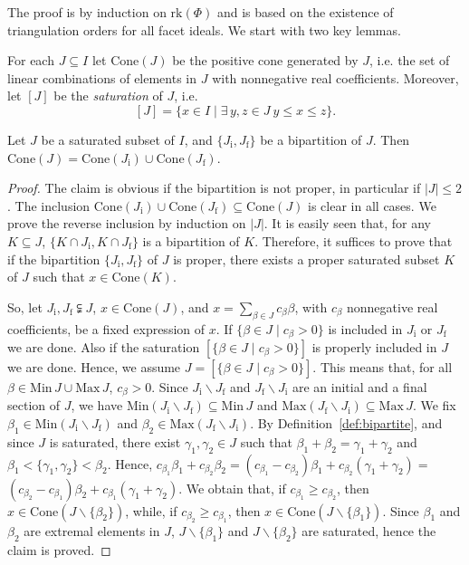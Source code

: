 \documentclass[ALCO,published]{cedram}
\theoremstyle{plain}
\newcommand\smeno{\smallsetminus}
\newcommand\cone{\mathrm{Cone}}
\newcommand\Min{\mathrm{Min}}
\newcommand\Max{\mathrm{Max}}
\newcommand\rk{\mathrm{rk}}
\newcommand\be{\beta}
\newcommand\ga{\gamma}
\renewcommand{\leq}{\leqslant}
\begin{document}
The proof is by induction on $\rk(\Phi)$ and is based on the existence of triangulation orders for all facet ideals. 
We start with two key lemmas. 

\par
For each $J\subseteq I$ let $\cone(J)$ be the positive cone generated by $J$, i.e. the set of linear combinations of elements in $J$ with nonnegative real coefficients.
Moreover, let $[J]$ be the {\it saturation} of $J$, i.e. 
$$[J]=\{x\in I\mid \exists\, y,z\in J\ y\leq x\leq z\}.$$ 


\begin{lem}\label{lem:coni-bipartite}
Let $J$ be a saturated subset of $I$, and  $\{J_{\mathrm i},J_{\mathrm f}\}$ be a  bipartition of $J$.
Then $\cone(J)=\cone(J_{\mathrm i})\cup \cone(J_{\mathrm f})$. 
\end{lem}

\begin{proof}
The claim is obvious if the bipartition is not proper, in particular if $|J|\leq 2$. 
The inclusion $\cone(J_{\mathrm i})\cup \cone(J_{\mathrm f})\subseteq \cone(J)$ is clear in all cases.
We prove the reverse inclusion by induction on $|J|$. 
It is easily seen that, for any $K\subseteq J$, $\{K\cap J_{\mathrm i}, K\cap J_{\mathrm f}\}$ is a bipartition of $K$.  
Therefore, it suffices to prove that if the bipartition $\{J_{\mathrm i},J_{\mathrm f}\}$ of $J$ is proper,  there exists a proper saturated subset $K$ of $J$ such that $x\in \cone(K)$. 
\par

So, let $J_{\mathrm i}, J_{\mathrm f}\subsetneqq J$, $x\in \cone(J)$, and $x=\sum\limits_{\be\in J}c_\be\be$,  with $c_\be$ nonnegative real coefficients, be a fixed expression of $x$.
If $\{\be\in J\mid c_\be> 0\}$ is included in $J_{\mathrm i}$ or $J_{\mathrm f}$ we are done.
Also if the saturation $[\{\be\in J\mid c_\be> 0\}]$ is properly included in $J$ we are done.
Hence, we assume  $J=[\{\be\in J\mid c_\be> 0\}]$. 
This means that, for all $\be\in \Min\, J\cup  \Max\, J$, $c_\be> 0$.
Since $J_{\mathrm i}\smeno J_{\mathrm f}$ and $J_{\mathrm f}\smeno J_{\mathrm i}$ are an initial and a final section of $J$, we have  $\Min(J_{\mathrm i}\smeno J_{\mathrm f})\subseteq \Min\, J$ and $\Max(J_{\mathrm f}\smeno J_{\mathrm i})\subseteq \Max\, J$.
We fix  $\be_1\in \Min (J_{\mathrm i}\smeno J_{\mathrm f})$ and $\be_2\in \Max(J_{\mathrm f}\smeno J_{\mathrm i})$.
By Definition~\ref{def:bipartite}, and since $J$ is saturated, there exist $\ga_1, \ga_2\in J$  such that $\be_1+\be_2=\ga_1+\ga_2$ and $\be_1< \{\ga_1, \ga_2\}< \be_2$. 
Hence, $c_{\be_1}\be_1+ c_{\be_2} \be_2=(c_{\be_1}-c_{\be_2}) \be_1 + c_{\be_2} (\ga_1+\ga_2) =$ $(c_{\be_2}-c_{\be_1}) \be_2 + c_{\be_1} (\ga_1+\ga_2)$.
We obtain that, if  $c_{\be_1}\geq  c_{\be_2}$, then $x\in \cone (J \smeno\{\be_2\})$, while, if  $c_{\be_2}\geq  c_{\be_1}$, then $x\in \cone (J \smeno\{\be_1\})$. 
Since $\be_1$ and $\be_2$ are extremal elements in $J$, $J \smeno\{\be_1\}$ and $J \smeno\{\be_2\}$ are saturated, hence the claim is proved.
\end{proof}
\end{document}

